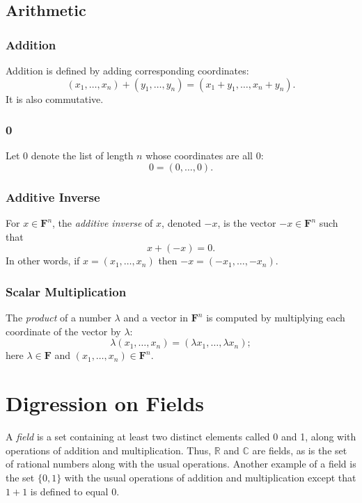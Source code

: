 \documentclass[11pt]{article}
\begin{document}
    \subsection{Arithmetic}

    \subsubsection{Addition}
    Addition is defined by adding corresponding coordinates: \[(x_1, \dots, x_n) + (y_1, \dots, y_n) = (x_1 + y_1, \dots, x_n + y_n).\] It is also commutative.

    \subsubsection{0}
    Let 0 denote the list of length $n$ whose coordinates are all 0: \[0 = (0, \dots, 0).\]

    \subsubsection{Additive Inverse}
    For \(x \in \textbf{F}^n\), the \emph{additive inverse} of $x$, denoted $-x$, is the vector \(-x \in \textbf{F}^n\) such that \[x + (-x) = 0.\] In other words, if \(x = (x_1, \dots, x_n)\) then \(-x = (-x_1, \dots, -x_n).\)

    \subsubsection{Scalar Multiplication}
    The \emph{product} of a number \(\lambda\) and a vector in \(\textbf{F}^n\) is computed by multiplying each coordinate of the vector by \(\lambda\): \[\lambda (x_1, \dots, x_n) = (\lambda x_1, \dots, \lambda x_n);\] here \(\lambda \in \textbf{F}\) and \((x_1, \dots, x_n) \in \textbf{F}^n.\)

    \section{Digression on Fields}
    A \emph{field} is a set containing at least two distinct elements called 0 and 1, along with operations of addition and multiplication. Thus, \(\mathbb{R}\) and \(\mathbb{C}\) are fields, as is the set of rational numbers along with the usual operations. Another example of a field is the set \(\{0,1\}\) with the usual operations of addition and multiplication except that \(1+1\) is defined to equal 0.
\end{document}
